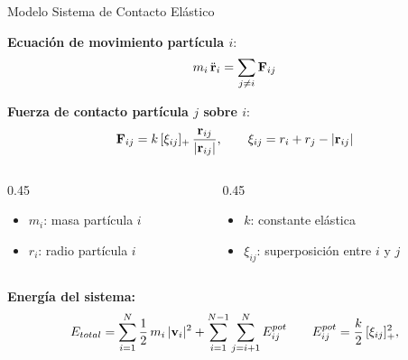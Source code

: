 \begin{frame}{Modelo Sistema de Contacto Elástico}

  \textbf{Ecuación de movimiento partícula $i$}:
  \[
    m_i\,\ddot{\mathbf{r}}_i = \sum_{j\neq i} \mathbf{F}_{ij}
  \]

  \textbf{Fuerza de contacto partícula $j$ sobre $i$}:
  \[
    \mathbf{F}_{ij} = k\,[\xi_{ij}]_{+}\,\frac{\mathbf{r}_{ij}}{|\mathbf{r}_{ij}|},
    \qquad
    \xi_{ij} = r_i + r_j - |\mathbf{r}_{ij}|
  \]

  \begin{columns}[T]
    \begin{column}{0.45\textwidth}
      \begin{itemize}
        \item $m_i$: masa partícula $i$
        \item $r_i$: radio partícula $i$
      \end{itemize}
    \end{column}
    \begin{column}{0.45\textwidth}
      \begin{itemize}
        \item $k$: constante elástica
        \item $\xi_{ij}$: superposición entre $i$ y $j$
      \end{itemize}
    \end{column}
  \end{columns}

  \vspace{10pt}
  \textbf{Energía del sistema:}
  \[
   E_{total} = \sum_{i=1}^{N} \frac{1}{2}\,m_i\,|\mathbf{v}_i|^{2}
    + \sum_{i=1}^{N-1}\sum_{j=i+1}^{N} E^{pot}_{ij}
    \qquad E^{pot}_{ij} = \frac{k}{2}\,[\xi_{ij}]_{+}^{2},
  \]
\end{frame}